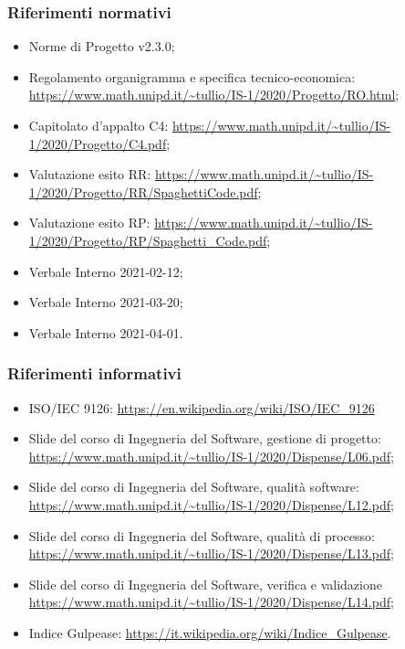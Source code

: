 \documentclass[../piano_di_qualifica.tex]{subfiles}
\begin{document}
\subsubsection{Riferimenti normativi}
\begin{itemize}
	\item Norme di Progetto v2.3.0;
	\item Regolamento organigramma e specifica tecnico-economica: \url{https://www.math.unipd.it/~tullio/IS-1/2020/Progetto/RO.html};
	\item Capitolato d’appalto C4: \url{https://www.math.unipd.it/~tullio/IS-1/2020/Progetto/C4.pdf};
	\item Valutazione esito RR: \url{https://www.math.unipd.it/~tullio/IS-1/2020/Progetto/RR/SpaghettiCode.pdf};
	\item Valutazione esito RP: \url{https://www.math.unipd.it/~tullio/IS-1/2020/Progetto/RP/Spaghetti_Code.pdf};
	\item Verbale Interno 2021-02-12;
	\item Verbale Interno 2021-03-20;
	\item Verbale Interno 2021-04-01.
\end{itemize}

\subsubsection{Riferimenti informativi}

\begin{itemize}
	\item ISO/IEC 9126: \url{https://en.wikipedia.org/wiki/ISO/IEC_9126}
	\item Slide del corso di Ingegneria del Software, gestione di progetto: \url{https://www.math.unipd.it/~tullio/IS-1/2020/Dispense/L06.pdf};
	\item Slide del corso di Ingegneria del Software, qualità software: \url{https://www.math.unipd.it/~tullio/IS-1/2020/Dispense/L12.pdf};
	\item Slide del corso di Ingegneria del Software, qualità di processo: \url{https://www.math.unipd.it/~tullio/IS-1/2020/Dispense/L13.pdf};
	\item Slide del corso di Ingegneria del Software, verifica e validazione \url{https://www.math.unipd.it/~tullio/IS-1/2020/Dispense/L14.pdf};
	\item Indice Gulpease: \url{https://it.wikipedia.org/wiki/Indice_Gulpease}.
\end{itemize}
\end{document}
